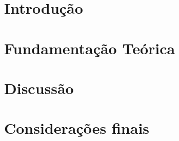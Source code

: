\documentclass[a4paper]{article}
\begin{document}
\tableofcontents
\newpage
{}

\section{Introdução}
\newpage

\section{Fundamentação Teórica}
\newpage

\section{Discussão}
\newpage

\section{Considerações finais}
\newpage

\newpage


\end{document}
